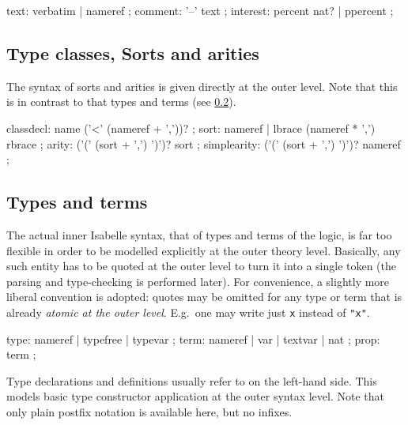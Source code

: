 \begin{rail}
  text: verbatim | nameref
  ;
  comment: '--' text
  ;
  interest: percent nat? | ppercent
  ;
\end{rail}


\subsection{Type classes, Sorts and arities}

The syntax of sorts and arities is given directly at the outer level.  Note
that this is in contrast to that types and terms (see \ref{sec:types-terms}).

\begin{rail}
  classdecl: name ('<' (nameref + ','))?
  ;
  sort: nameref | lbrace (nameref * ',') rbrace
  ;
  arity: ('(' (sort + ',') ')')? sort
  ;
  simplearity: ('(' (sort + ',') ')')? nameref
  ;
\end{rail}


\subsection{Types and terms}\label{sec:types-terms}

The actual inner Isabelle syntax, that of types and terms of the logic, is far
too flexible in order to be modelled explicitly at the outer theory level.
Basically, any such entity has to be quoted at the outer level to turn it into
a single token (the parsing and type-checking is performed later).  For
convenience, a slightly more liberal convention is adopted: quotes may be
omitted for any type or term that is already \emph{atomic at the outer level}.
E.g.\ one may write just \texttt{x} instead of \texttt{"x"}.

\begin{rail}
  type: nameref | typefree | typevar
  ;
  term: nameref | var | textvar | nat
  ;
  prop: term
  ;
\end{rail}

Type declarations and definitions usually refer to  on
the left-hand side.  This models basic type constructor application at the
outer syntax level.  Note that only plain postfix notation is available here,
but no infixes.


